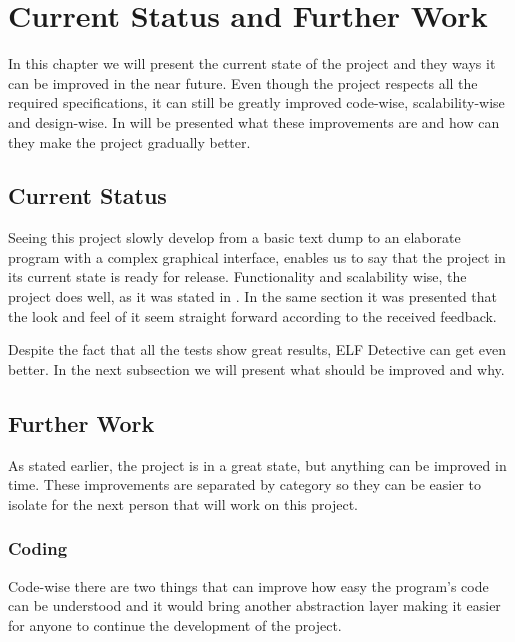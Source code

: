 
\chapter{Current Status and Further Work}
\label{chapter:crt-frth}

In this chapter we will present the current state of the project and they ways it can be improved in the near future. Even though the project respects all the required specifications, it can still be greatly improved code-{}wise, scalability-{}wise and design-{}wise. In  will be presented what these improvements are and how can they make the project gradually better.


\section{Current Status}
\label{sec:crt-stat}

Seeing this project slowly develop from a basic text dump to an elaborate program with a complex graphical interface, enables us to say that the project in its current state is ready for release. Functionality and scalability wise, the project does well, as it was stated in . In the same section it was presented that the look and feel of it seem straight forward according to the received feedback.

Despite the fact that all the tests show great results, ELF Detective can get even better. In the next subsection we will present what should be improved and why.

\section{Further Work}
\label{sec:furth-work}

As stated earlier, the project is in a great state, but anything can be improved in time. These improvements are separated by category so they can be easier to isolate for the next person that will work on this project.

\subsection{Coding}
\label{sub-sec:coding}

Code-{}wise there are two things that can improve how easy the program's code can be understood and it would bring another abstraction layer making it easier for anyone to continue the development of the project.

